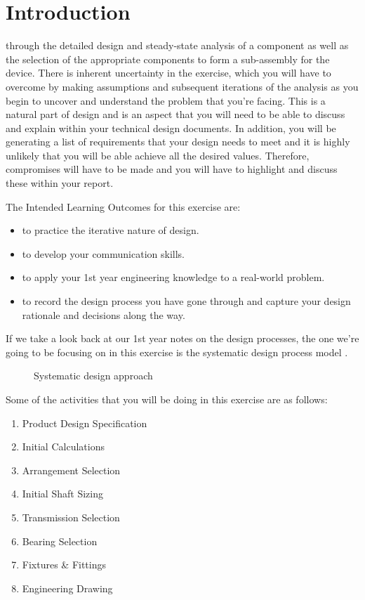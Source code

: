 \section{Introduction}

 through the detailed design and steady-state analysis of a component as well as the selection of the appropriate components to form a sub-assembly for the device. 
There is inherent uncertainty in the exercise, which you will have to overcome by making assumptions and subsequent iterations of the analysis as you begin to uncover and understand the problem that you're facing. 
This is a natural part of design and is an aspect that you will need to be able to discuss and explain within your technical design documents. 
In addition, you will be generating a list of requirements that your design needs to meet and it is highly unlikely that you will be able achieve all the desired values. 
Therefore, compromises will have to be made and you will have to highlight and discuss these within your report.

The Intended Learning Outcomes for this exercise are:

\begin{itemize}
    \item to practice the iterative nature of design.
    \item to develop your communication skills.
    \item to apply your 1st year engineering knowledge to a real-world problem.
    \item to record the design process you have gone through and capture your design rationale and decisions along the way.
\end{itemize}

If we take a look back at our 1st year notes on the design processes, the one we're going to be focusing on in this exercise is the systematic design process model .

\begin{figure}[h!]
    \centering
    
    \caption[Systematic design approach]{Systematic design approach \cite{pahl2013}}\label{fig-vdi}
\end{figure}

Some of the activities that you will be doing in this exercise are as follows:

\begin{enumerate}
    \item Product Design Specification
    \item Initial Calculations
    \item Arrangement Selection
    \item Initial Shaft Sizing
    \item Transmission Selection
    \item Bearing Selection
    \item Fixtures \& Fittings
    \item Engineering Drawing
\end{enumerate}

